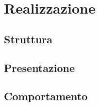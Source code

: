 \section{Realizzazione}
    \subsection{Struttura}
    \subsection{Presentazione}
    \subsection{Comportamento}